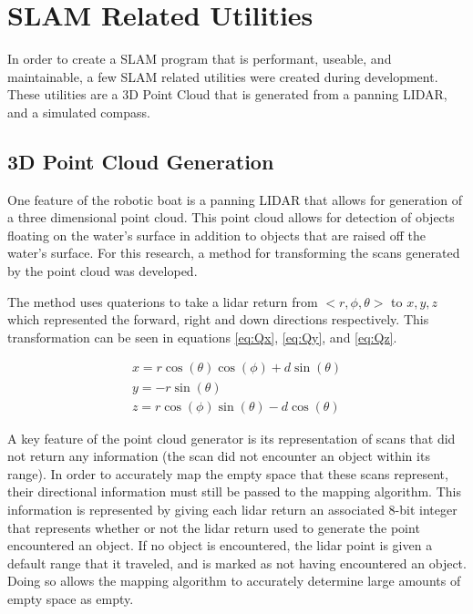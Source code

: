 \documentclass[10pt]{IEEEtran}
\begin{document}
\section{SLAM Related Utilities}
In order to create a SLAM program that is performant, useable, and maintainable, a few 
SLAM related utilities were created during development.  These utilities are a 3D Point Cloud
that is generated from a panning LIDAR, and a simulated compass.

\subsection{3D Point Cloud Generation}\label{pointcloud}
One feature of the robotic boat is a panning LIDAR that allows for generation of a three 
dimensional point cloud.  This point cloud allows for detection of objects floating on the
water's surface in addition to objects that are raised off the water's surface. 
For this research, a method for transforming the scans generated by the point cloud was 
developed.  

The method uses quaterions to take a lidar return from \(<r, \phi, \theta>\) to 
\(x,y,z\) which represented the forward, right and down directions respectively.  
This transformation can be seen in equations \ref{eq:Qx}, \ref{eq:Qy}, and \ref{eq:Qz}.

\begin{align}
	\label{eq:Qx}
	x = r\cos(\theta)\cos(\phi) + d \sin(\theta) \\
	\label{eq:Qy}
	y = -r \sin(\theta) \\
	\label{eq:Qz}
	z = r \cos(\phi)\sin(\theta) - d \cos(\theta) 
\end{align}

A key feature of the point cloud generator is its representation of scans that did not 
return any information (the scan did not encounter an object within its range).  In order
to accurately map the empty space that these scans represent, their directional information
must still be passed to the mapping algorithm.  This information is represented by giving
each lidar return an associated 8-bit integer that represents whether or not the lidar
return used to generate the point encountered an object.  If no object is encountered,
the lidar point is given a default range that it traveled, and is marked as not having 
encountered an object.  Doing so allows the mapping algorithm to accurately determine
large amounts of empty space as empty.
\end{document}

